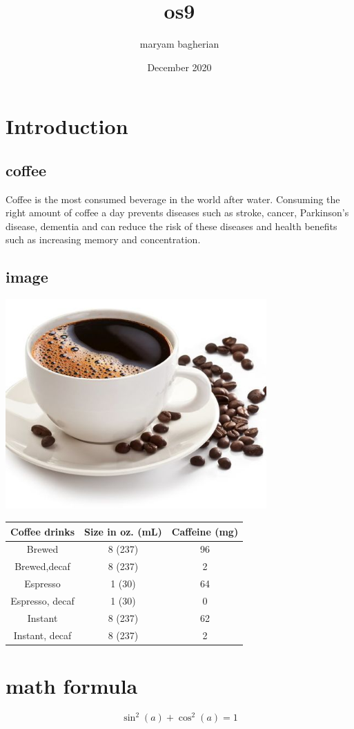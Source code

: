 \documentclass{article}
\begin{document}
\title{os9}
\author{maryam bagherian}
\date{December 2020}
\maketitle
\section{Introduction}
\subsection{coffee}
Coffee is the most consumed beverage in the world after water.
Consuming the right amount of coffee a day prevents diseases such as stroke, cancer, Parkinson's disease, dementia and can reduce the risk of these diseases and health benefits such as increasing memory and concentration.
\subsection{image}
\includegraphics[width=10cm]{coffee.jpg}


\label{tab:table}
\begin{tabular}{|c|c|c|}
\hline
\textbf{Coffee drinks} & \textbf{Size in oz. (mL)} & \textbf{Caffeine (mg)}\\
\hline
Brewed & 8 (237) & 96 \\
Brewed,decaf & 8 (237) & 2\\
Espresso &  1 (30) & 64\\
Espresso, decaf & 1 (30) & 0\\
Instant  & 8 (237) & 62\\
Instant, decaf & 8 (237) & 2\\
\hline
\end{tabular}
\section{math formula}
\[
\sin^2(a)+\cos^2(a) = 1
\]
\end{document}
